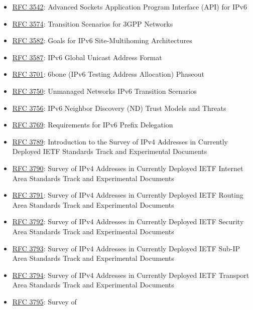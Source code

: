 \documentclass[
]{article}
\begin{document}
\begin{itemize}
\item
  \href{https://www.rfc-editor.org/info/rfc3542}{RFC 3542}: Advanced
  Sockets Application Program Interface (API) for IPv6
\item
  \href{https://www.rfc-editor.org/info/rfc3574}{RFC 3574}: Transition
  Scenarios for 3GPP Networks
\item
  \href{https://www.rfc-editor.org/info/rfc3582}{RFC 3582}: Goals for
  IPv6 Site-Multihoming Architectures
\item
  \href{https://www.rfc-editor.org/info/rfc3587}{RFC 3587}: IPv6 Global
  Unicast Address Format
\item
  \href{https://www.rfc-editor.org/info/rfc3701}{RFC 3701}: 6bone (IPv6
  Testing Address Allocation) Phaseout
\item
  \href{https://www.rfc-editor.org/info/rfc3750}{RFC 3750}: Unmanaged
  Networks IPv6 Transition Scenarios
\item
  \href{https://www.rfc-editor.org/info/rfc3756}{RFC 3756}: IPv6
  Neighbor Discovery (ND) Trust Models and Threats
\item
  \href{https://www.rfc-editor.org/info/rfc3769}{RFC 3769}: Requirements
  for IPv6 Prefix Delegation
\item
  \href{https://www.rfc-editor.org/info/rfc3789}{RFC 3789}: Introduction
  to the Survey of IPv4 Addresses in Currently Deployed IETF Standards
  Track and Experimental Documents
\item
  \href{https://www.rfc-editor.org/info/rfc3790}{RFC 3790}: Survey of
  IPv4 Addresses in Currently Deployed IETF Internet Area Standards
  Track and Experimental Documents
\item
  \href{https://www.rfc-editor.org/info/rfc3791}{RFC 3791}: Survey of
  IPv4 Addresses in Currently Deployed IETF Routing Area Standards Track
  and Experimental Documents
\item
  \href{https://www.rfc-editor.org/info/rfc3792}{RFC 3792}: Survey of
  IPv4 Addresses in Currently Deployed IETF Security Area Standards
  Track and Experimental Documents
\item
  \href{https://www.rfc-editor.org/info/rfc3793}{RFC 3793}: Survey of
  IPv4 Addresses in Currently Deployed IETF Sub-IP Area Standards Track
  and Experimental Documents
\item
  \href{https://www.rfc-editor.org/info/rfc3794}{RFC 3794}: Survey of
  IPv4 Addresses in Currently Deployed IETF Transport Area Standards
  Track and Experimental Documents
\item
  \href{https://www.rfc-editor.org/info/rfc3795}{RFC 3795}: Survey of

\end{itemize}
\end{document}
